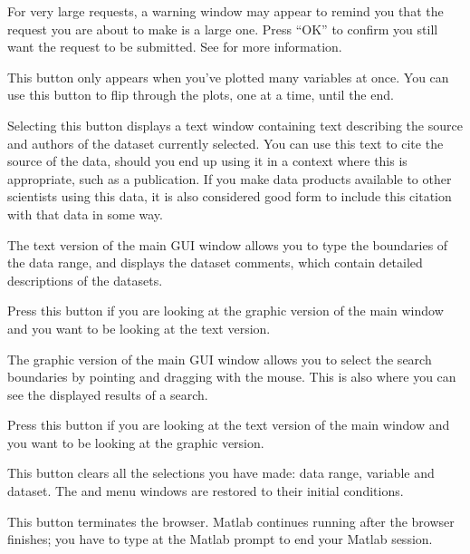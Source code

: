 \begin{description}
For very large requests, a warning window may appear to remind you
that the request you are about to make is a large one. Press ``OK'' to
confirm you still want the request to be submitted.  See
 for more information.


This button only appears when you've plotted many variables at once.
You can use this button to flip through the plots, one at a time,
until the end.


Selecting this button displays a text window containing text
describing the source and authors of the dataset currently selected.
You can use this text to cite the source of the data, should you end
up using it in a context where this is appropriate, such as a
publication.  If you make data products available to other scientists
using this data, it is also considered good form to include this
citation with that data in some way.


The text version of the main GUI window allows you to type the
boundaries of the data range, and displays the dataset comments, which
contain detailed descriptions of the datasets.

Press this button if you are looking at the graphic version of the
main window and you want to be looking at the text version. 


The graphic version of the main GUI window allows you to select the
search boundaries by pointing and dragging with the mouse. This is
also where you can see the displayed results of a search. 

Press this button if you are looking at the text version of the main
window and you want to be looking at the graphic version. 


This button clears all the selections you have made: data range,
variable and dataset. The  and  menu
windows are restored to their initial conditions.


This button terminates the browser. Matlab continues running after the
browser finishes; you have to type  at the Matlab prompt to
end your Matlab session. 

\end{description}

